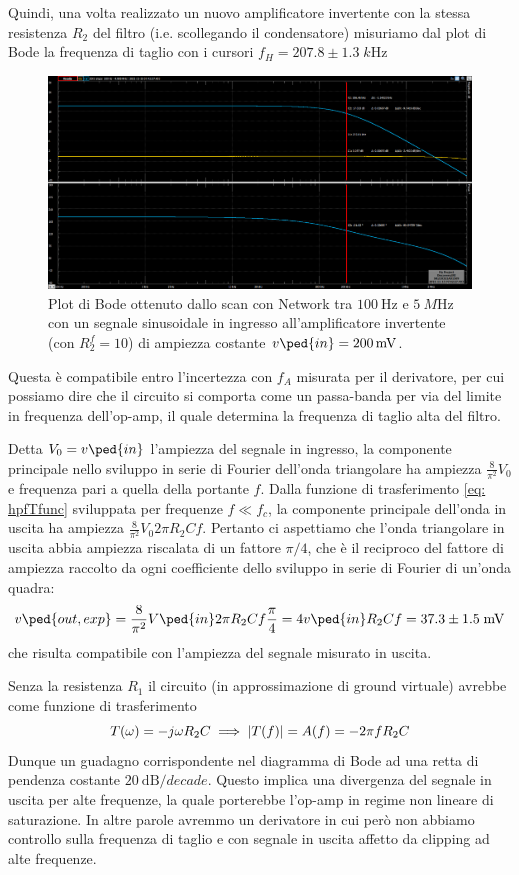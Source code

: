 \documentclass[10pt,a4paper]{article}
\begin{document}
Quindi, una volta realizzato un nuovo amplificatore invertente con la
stessa resistenza $R_2$ del filtro (i.e. scollegando il condensatore)
misuriamo dal plot di Bode la frequenza di taglio con i cursori
$f_H = 207.8 \pm 1.3 \; \si{k\Hz}$
\begin{figure}[htbp]
\centering
\includegraphics[scale=0.36]{ampinv10}
\caption{Plot di Bode ottenuto dallo scan con Network tra $\SI{100}{\Hz}$ e
$\SI{5}{M\Hz}$ con un segnale sinusoidale in ingresso all'amplificatore
invertente (con $R_2^f=10$) di ampiezza costante $v\ped{in} = \SI{200}{m\V}$.
\label{fig: ampinv10}}
\end{figure}

Questa è compatibile entro l'incertezza con $f_A$ misurata per il derivatore,
per cui possiamo dire che il circuito si comporta come un passa-banda per via
del limite in frequenza dell'op-amp, il quale determina la frequenza di taglio
alta del filtro.

Detta $V_{0} = v\ped{in} $ l'ampiezza del segnale in ingresso, la componente
principale nello sviluppo in serie di Fourier dell'onda triangolare ha ampiezza 
$\frac{8}{\pi^2} V_{0} $ e frequenza pari a quella della portante $f$.
Dalla funzione di trasferimento \eqref{eq: hpfTfunc} sviluppata per frequenze
$f \ll f_c$, la componente principale dell'onda in uscita ha ampiezza
$\frac{8}{\pi^2} V_{0} 2\pi R_2 C f $. Pertanto ci aspettiamo che l'onda
triangolare in uscita abbia ampiezza riscalata di un fattore $\pi/4$, che è
il reciproco del fattore di ampiezza raccolto da ogni coefficiente dello
sviluppo in serie di Fourier di un'onda quadra:
\[
v\ped{out, exp} = \frac{8}{\pi^{2}} V\ped{in} 2 \pi R_{2} C f \frac{\pi}{4} =
4 v\ped{in} R_{2} C f = 37.3 \pm 1.5 \; \si{m\V}
\]
che risulta compatibile con l'ampiezza del segnale misurato in uscita.

Senza la resistenza $R_1$ il circuito (in approssimazione di ground virtuale)
avrebbe come funzione di trasferimento
\[
T(\omega) = - j \omega R_2 C \implies
\left| T(f) \right| = A(f) =  - 2\pi f R_2 C
\]
Dunque un guadagno corrispondente nel diagramma di Bode ad una retta di
pendenza costante $\SI{20}{\deci\bel/decade}$.
Questo implica una divergenza del segnale in uscita per alte frequenze, la
quale porterebbe l'op-amp in regime non lineare di saturazione.
In altre parole avremmo un derivatore in cui però non abbiamo controllo sulla
frequenza di taglio e con segnale in uscita affetto da clipping ad alte
frequenze.
\end{document}
